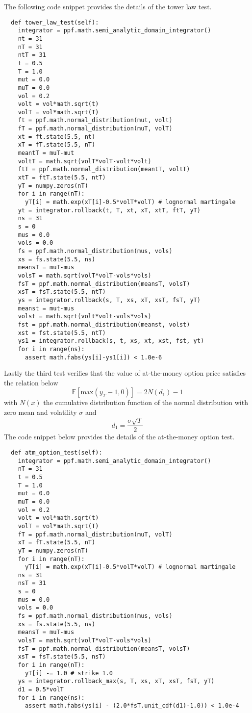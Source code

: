 The following code snippet provides the details of the tower law test.
\begin{verbatim}
  def tower_law_test(self):
    integrator = ppf.math.semi_analytic_domain_integrator()
    nt = 31
    nT = 31
    ntT = 31
    t = 0.5
    T = 1.0
    mut = 0.0
    muT = 0.0
    vol = 0.2
    volt = vol*math.sqrt(t)
    volT = vol*math.sqrt(T)
    ft = ppf.math.normal_distribution(mut, volt)
    fT = ppf.math.normal_distribution(muT, volT)
    xt = ft.state(5.5, nt)
    xT = fT.state(5.5, nT)
    meantT = muT-mut
    voltT = math.sqrt(volT*volT-volt*volt)
    ftT = ppf.math.normal_distribution(meantT, voltT)
    xtT = ftT.state(5.5, ntT)
    yT = numpy.zeros(nT)
    for i in range(nT): 
      yT[i] = math.exp(xT[i]-0.5*volT*volT) # lognormal martingale
    yt = integrator.rollback(t, T, xt, xT, xtT, ftT, yT)
    ns = 31
    s = 0
    mus = 0.0
    vols = 0.0
    fs = ppf.math.normal_distribution(mus, vols)
    xs = fs.state(5.5, ns)
    meansT = muT-mus
    volsT = math.sqrt(volT*volT-vols*vols)
    fsT = ppf.math.normal_distribution(meansT, volsT)
    xsT = fsT.state(5.5, ntT)
    ys = integrator.rollback(s, T, xs, xT, xsT, fsT, yT)
    meanst = mut-mus
    volst = math.sqrt(volt*volt-vols*vols)
    fst = ppf.math.normal_distribution(meanst, volst)
    xst = fst.state(5.5, ntT)
    ys1 = integrator.rollback(s, t, xs, xt, xst, fst, yt)
    for i in range(ns):
      assert math.fabs(ys[i]-ys1[i]) < 1.0e-6
\end{verbatim}
Lastly the third test verifies that the value of at-the-money option
price satisfies the relation below
\begin{equation}
\mathbb E[\mbox{max}(y_T-1,0)] = 2 N(d_1)-1 
\end{equation}
with $N(x)$ the cumulative distribution function of the normal
distribution with zero mean and volatility $\sigma$ and
\begin{equation}
d_1 = \frac{\sigma \sqrt{T}}{2}
\end{equation}
The code snippet below provides the details of the at-the-money option
test.
\begin{verbatim}
  def atm_option_test(self):
    integrator = ppf.math.semi_analytic_domain_integrator()
    nT = 31
    t = 0.5
    T = 1.0
    mut = 0.0
    muT = 0.0
    vol = 0.2
    volt = vol*math.sqrt(t)
    volT = vol*math.sqrt(T)
    fT = ppf.math.normal_distribution(muT, volT)
    xT = fT.state(5.5, nT)
    yT = numpy.zeros(nT)
    for i in range(nT): 
      yT[i] = math.exp(xT[i]-0.5*volT*volT) # lognormal martingale
    ns = 31
    nsT = 31
    s = 0
    mus = 0.0
    vols = 0.0
    fs = ppf.math.normal_distribution(mus, vols)
    xs = fs.state(5.5, ns)
    meansT = muT-mus
    volsT = math.sqrt(volT*volT-vols*vols)
    fsT = ppf.math.normal_distribution(meansT, volsT)
    xsT = fsT.state(5.5, nsT)
    for i in range(nT): 
      yT[i] -= 1.0 # strike 1.0
    ys = integrator.rollback_max(s, T, xs, xT, xsT, fsT, yT)
    d1 = 0.5*volT
    for i in range(ns): 
      assert math.fabs(ys[i] - (2.0*fsT.unit_cdf(d1)-1.0)) < 1.0e-4
\end{verbatim}
